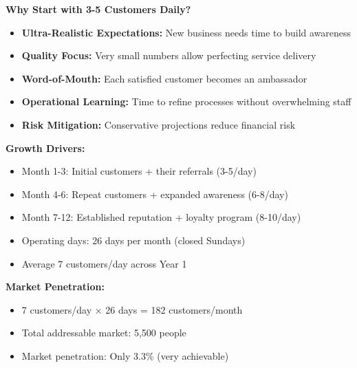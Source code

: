 \begin{tcolorbox}[mybox, title=\textbf{Conservative Forecast Rationale}]
\textbf{Why Start with 3-5 Customers Daily?}
\begin{itemize}[leftmargin=1em, itemsep=0pt]
    \item \textbf{Ultra-Realistic Expectations:} New business needs time to build awareness
    \item \textbf{Quality Focus:} Very small numbers allow perfecting service delivery
    \item \textbf{Word-of-Mouth:} Each satisfied customer becomes an ambassador
    \item \textbf{Operational Learning:} Time to refine processes without overwhelming staff
    \item \textbf{Risk Mitigation:} Conservative projections reduce financial risk
\end{itemize}

\textbf{Growth Drivers:}
\begin{itemize}[leftmargin=1em, itemsep=0pt]
    \item Month 1-3: Initial customers + their referrals (3-5/day)
    \item Month 4-6: Repeat customers + expanded awareness (6-8/day)
    \item Month 7-12: Established reputation + loyalty program (8-10/day)
    \item Operating days: 26 days per month (closed Sundays)
    \item Average 7 customers/day across Year 1
\end{itemize}

\textbf{Market Penetration:}
\begin{itemize}[leftmargin=1em, itemsep=0pt]
    \item 7 customers/day × 26 days = 182 customers/month
    \item Total addressable market: 5,500 people
    \item Market penetration: Only 3.3\% (very achievable)
\end{itemize}
\end{tcolorbox}

\vspace{1em}

